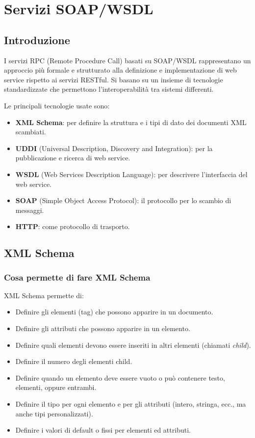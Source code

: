 \chapter{Servizi SOAP/WSDL}

\section{Introduzione}

I servizi RPC (Remote Procedure Call) basati su SOAP/WSDL rappresentano un approccio più formale e strutturato alla definizione e implementazione di web service rispetto ai servizi RESTful. Si basano su un insieme di tecnologie standardizzate che permettono l'interoperabilità tra sistemi differenti.

Le principali tecnologie usate sono:

\begin{itemize}
    \item \textbf{XML Schema}: per definire la struttura e i tipi di dato dei documenti XML scambiati.
    \item \textbf{UDDI} (Universal Description, Discovery and Integration): per la pubblicazione e ricerca di web service.
    \item \textbf{WSDL} (Web Services Description Language): per descrivere l'interfaccia del web service.
    \item \textbf{SOAP} (Simple Object Access Protocol): il protocollo per lo scambio di messaggi.
    \item \textbf{HTTP}: come protocollo di trasporto.
\end{itemize}

\section{XML Schema}

\subsection{Cosa permette di fare XML Schema}

XML Schema permette di:

\begin{itemize}
    \item Definire gli elementi (tag) che possono apparire in un documento.
    \item Definire gli attributi che possono apparire in un elemento.
    \item Definire quali elementi devono essere inseriti in altri elementi (chiamati \emph{child}).
    \item Definire il numero degli elementi child.
    \item Definire quando un elemento deve essere vuoto o può contenere testo, elementi, oppure entrambi.
    \item Definire il tipo per ogni elemento e per gli attributi (intero, stringa, ecc., ma anche tipi personalizzati).
    \item Definire i valori di default o fissi per elementi ed attributi.
\end{itemize}

